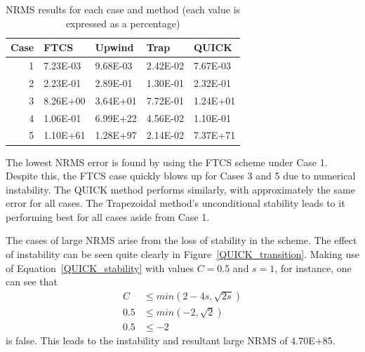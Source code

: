 \documentclass[twocolumn,10pt]{asme2ej}
\begin{document}
\begin{table}[tb]
\begin{center}
\begin{tabular}{|r | l l l l|}
\hline
Case & FTCS & Upwind & Trap & QUICK  \\
\hline
1 & 7.23E-03 & 9.68E-03 & 2.42E-02 & 7.67E-03 \\
2 & 2.23E-01 & 2.89E-01 & 1.30E-01 & 2.32E-01 \\
3 & 8.26E+00 & 3.64E+01 & 7.72E-01 & 1.24E+01 \\
4 & 1.06E-01 & 6.99E+22 & 4.56E-02 & 1.10E-01 \\
5 & 1.10E+61 & 1.28E+97 & 2.14E-02 & 7.37E+71 \\
\hline
\end{tabular}
\caption{NRMS results for each case and method (each value is expressed as a percentage)}
\label{rms_table}
\end{center}
\end{table}

The lowest NRMS error is found by using the FTCS scheme under Case 1. Despite this, the FTCS case quickly blows up for Cases 3 and 5 due to numerical instability. The QUICK method performs similarly, with approximately the same error for all cases. The Trapezoidal method's unconditional stability leads to it performing best for all cases aside from Case 1.

The cases of large NRMS arise from the loss of stability in the scheme. The effect of instability can be seen quite clearly in Figure~\ref{QUICK_transition}. Making use of Equation~\ref{QUICK_stability} with values $C=0.5$ and $s=1$, for instance, one can see that
\begin{equation}
\begin{split}
C   & \leq min(2 - 4 s, \sqrt{2s}) \\
0.5 & \leq min(-2, \sqrt 2) \\
0.5 & \leq -2
\end{split}
\end{equation}
is false. This leads to the instability and resultant large NRMS of 4.70E+85.
\end{document}
